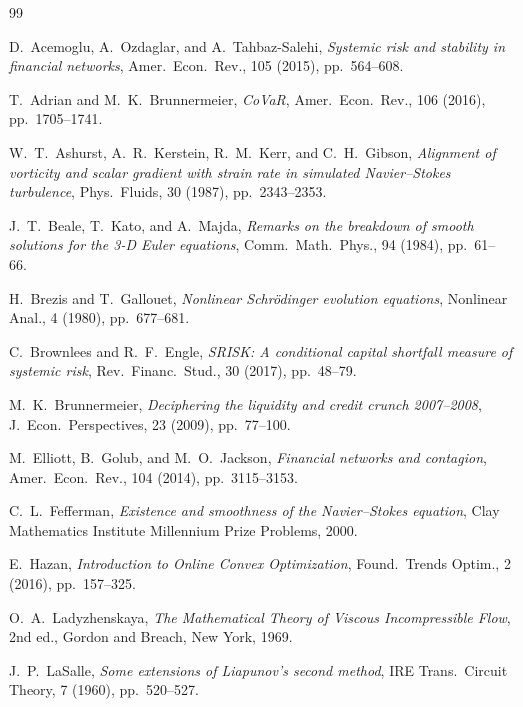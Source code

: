 \documentclass[final]{siamltex}
\begin{document}

\begin{thebibliography}{99}

D.~Acemoglu, A.~Ozdaglar, and A.~Tahbaz-Salehi,
\emph{Systemic risk and stability in financial networks},
Amer.\ Econ.\ Rev., 105 (2015), pp.~564--608.

T.~Adrian and M.~K.~Brunnermeier,
\emph{CoVaR},
Amer.\ Econ.\ Rev., 106 (2016), pp.~1705--1741.

W.~T.~Ashurst, A.~R.~Kerstein, R.~M.~Kerr, and C.~H.~Gibson,
\emph{Alignment of vorticity and scalar gradient with strain rate
in simulated Navier--Stokes turbulence},
Phys.\ Fluids, 30 (1987), pp.~2343--2353.

J.~T.~Beale, T.~Kato, and A.~Majda,
\emph{Remarks on the breakdown of smooth solutions for the 3-D
Euler equations},
Comm.\ Math.\ Phys., 94 (1984), pp.~61--66.

H.~Brezis and T.~Gallouet,
\emph{Nonlinear Schr\"odinger evolution equations},
Nonlinear Anal., 4 (1980), pp.~677--681.

C.~Brownlees and R.~F.~Engle,
\emph{SRISK: A conditional capital shortfall measure of systemic
risk},
Rev.\ Financ.\ Stud., 30 (2017), pp.~48--79.

M.~K.~Brunnermeier,
\emph{Deciphering the liquidity and credit crunch 2007--2008},
J.\ Econ.\ Perspectives, 23 (2009), pp.~77--100.

M.~Elliott, B.~Golub, and M.~O.~Jackson,
\emph{Financial networks and contagion},
Amer.\ Econ.\ Rev., 104 (2014), pp.~3115--3153.

C.~L.~Fefferman,
\emph{Existence and smoothness of the Navier--Stokes equation},
Clay Mathematics Institute Millennium Prize Problems, 2000.

E.~Hazan,
\emph{Introduction to Online Convex Optimization},
Found.\ Trends Optim., 2 (2016), pp.~157--325.

O.~A.~Ladyzhenskaya,
\emph{The Mathematical Theory of Viscous Incompressible Flow},
2nd ed., Gordon and Breach, New York, 1969.

J.~P.~LaSalle,
\emph{Some extensions of Liapunov's second method},
IRE Trans.\ Circuit Theory, 7 (1960), pp.~520--527.


\end{thebibliography}
\end{document}
